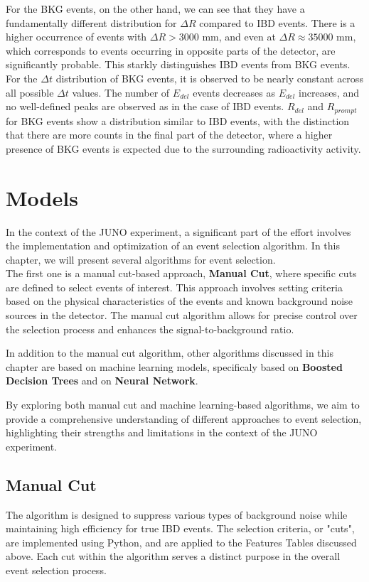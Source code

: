 For the BKG events, on the other hand, we can see that they have a fundamentally different distribution for \( \Delta R \) compared to IBD events. There is a higher occurrence of events with \( \Delta R > 3000 \) mm, and even at \( \Delta R \approx 35000 \) mm, which corresponds to events occurring in opposite parts of the detector, are significantly probable. This starkly distinguishes IBD events from BKG events. For the \( \Delta t \) distribution of BKG events, it is observed to be nearly constant across all possible \( \Delta t \) values. The number of \( E_{del} \) events decreases as \( E_{del} \) increases, and no well-defined peaks are observed as in the case of IBD events. \( R_{del} \) and \( R_{prompt} \) for BKG events show a distribution similar to IBD events, with the distinction that there are more counts in the final part of the detector, where a higher presence of BKG events is expected due to the surrounding radioactivity activity.


\section{Models}
In the context of the JUNO experiment, a significant part of the effort involves the implementation and optimization of an event selection algorithm. In this chapter, we will present several algorithms for event selection.\\
 
The first one is a manual cut-based approach, \textbf{Manual Cut}, where specific cuts are defined to select events of interest. This approach involves setting criteria based on the physical characteristics of the events and known background noise sources in the detector. The manual cut algorithm allows for precise control over the selection process and enhances the signal-to-background ratio.

In addition to the manual cut algorithm, other algorithms discussed in this chapter are based on machine learning models, specificaly based on \textbf{Boosted Decision Trees} and on \textbf{Neural Network}. 

By exploring both manual cut and machine learning-based algorithms, we aim to provide a comprehensive understanding of different approaches to event selection, highlighting their strengths and limitations in the context of the JUNO experiment.

\subsection{Manual Cut}
The algorithm is designed to suppress various types of background noise while maintaining high efficiency for true IBD events. The selection criteria, or "cuts", are implemented using Python, and are applied to the Features Tables discussed above. Each cut within the algorithm serves a distinct purpose in the overall event selection process.

